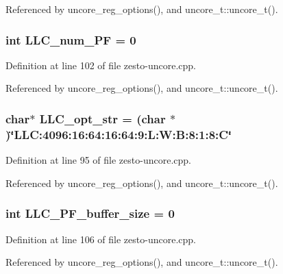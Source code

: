 Referenced by uncore\_\-reg\_\-options(), and uncore\_\-t::uncore\_\-t().
\subsubsection[{LLC\_\-num\_\-PF}]{\setlength{\rightskip}{0pt plus 5cm}int {\bf LLC\_\-num\_\-PF} = 0\hspace{0.3cm}{\tt  [static]}}\label{zesto-uncore_8cpp_979546f7e0178df32c8ac226a01a506c}




Definition at line 102 of file zesto-uncore.cpp.

Referenced by uncore\_\-reg\_\-options(), and uncore\_\-t::uncore\_\-t().
\subsubsection[{LLC\_\-opt\_\-str}]{\setlength{\rightskip}{0pt plus 5cm}char$\ast$ {\bf LLC\_\-opt\_\-str} = (char $\ast$)\char`\"{}LLC:4096:16:64:16:64:9:L:W:B:8:1:8:C\char`\"{}\hspace{0.3cm}{\tt  [static]}}\label{zesto-uncore_8cpp_a1db39c91dac04a498eec73722919831}




Definition at line 95 of file zesto-uncore.cpp.

Referenced by uncore\_\-reg\_\-options(), and uncore\_\-t::uncore\_\-t().
\subsubsection[{LLC\_\-PF\_\-buffer\_\-size}]{\setlength{\rightskip}{0pt plus 5cm}int {\bf LLC\_\-PF\_\-buffer\_\-size} = 0\hspace{0.3cm}{\tt  [static]}}\label{zesto-uncore_8cpp_8c6d473b0c0ada4a4a615f9cee4122aa}




Definition at line 106 of file zesto-uncore.cpp.

Referenced by uncore\_\-reg\_\-options(), and uncore\_\-t::uncore\_\-t().
